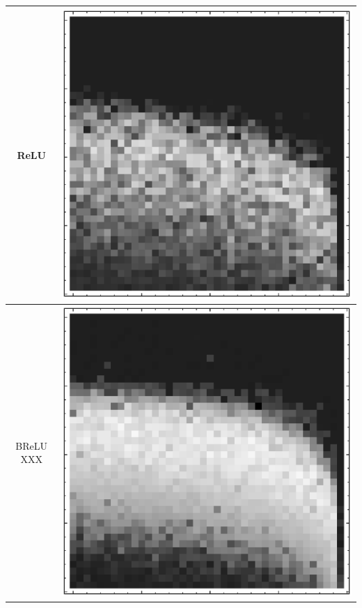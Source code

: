 \documentclass[10pt]{article}
\begin{document}
\begin{tabular}{|c|c|}
ReLU 
        & \includegraphics[scale=0.25]{plots/simple/LF-20R10R-20T10-CIFAR-3.eps} \\ \hline
BReLU XXX
        & \includegraphics[scale=0.25]{plots/simple/LF-20BR10BR-20T10-CIFAR-3.eps} \\ \hline
\end{tabular}
\end{document}
